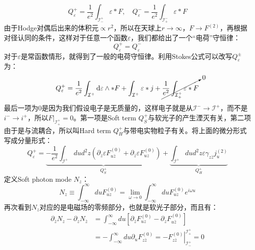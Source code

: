 \begin{equation}
	\boxed{
		Q_{\varepsilon}^{+}=\frac{1}{e^{2}}\int_{\mathcal I_{-}^{+}}\varepsilon*F,\quad Q_{\varepsilon}^{-}=\frac{1}{e^{2}}\int_{\mathcal I_{+}^{-}}\varepsilon*F
	}
\end{equation}
由于Hodge对偶后出来的体积元$\propto r^2$，所以在天球上$r\to\infty$，$F\to F^{(2)}$，再根据对径认同的条件，这样对于任意一个函数$\varepsilon$，我们都给出了一个“电荷”守恒律：
\begin{equation}
	\boxed{
	Q_\varepsilon^+=Q_\varepsilon^-
	}
\end{equation}
对于$\varepsilon$是常函数情形，就得到了一般的电荷守恒律。利用Stokes公式可以改写$Q_\varepsilon^{\pm}$为：
\begin{equation}
	Q_\varepsilon^+=\frac{1}{e^2}\int_{\mathcal{I}^+}\mathrm{d}\varepsilon\wedge*F+\int_{\mathcal{I}^+}\varepsilon*j+\cancelto{0}{\frac{1}{e^2}\int_{\mathcal{I}_+^+}\varepsilon*F}
\end{equation}
最后一项为0是因为我们假设电子是无质量的，这样电子就是从$\mathcal{I}^-\to\mathcal{I}^+$，而不是$i^{-}\to i^+$，所以$F|_{\mathcal{I}_+^{+}}=0$。第一项是Soft term $Q_S^+$与软光子的产生湮灭有关，第二项由于是与流耦合，所以叫Hard term $Q_H^+$与带电实物粒子有关。将上面的微分形式写成分量形式：
\begin{equation}
	Q_{\varepsilon}^{+}=\underbrace{-\frac{1}{e^{2}}\int_{\mathcal{I}^{+}}dud^{2}z\left(\partial_{z}\varepsilon F_{u\bar{z}}^{(0)}+\partial_{\bar{z}}\varepsilon F_{uz}^{(0)}\right)}_{Q_{S}^{+}}+\underbrace{\int_{\mathcal{I}^{+}}dud^{2}z\varepsilon\gamma_{z\bar{z}}j_{u}^{(2)}}_{Q_{H}^{+}}
\end{equation}
定义Soft photon mode $N_z$：
\begin{equation}\label{eq:23.18}
	N_{z}\equiv \int_{-\infty}^{\infty}duF_{uz}^{(0)}=\lim_{\omega\to0}\int_{-\infty}^{\infty}duF_{uz}^{(0)}e^{i\omega u}
\end{equation}
再次看到$N_z$对应的是电磁场的零频部分，也就是软光子部分，而且有：
\begin{equation}
	\begin{aligned}
		\partial_{\bar{z}}N_{z}-\partial_{z}N_{\bar{z}}& =\int_{-\infty}^{\infty}du\left[\partial_{\bar{z}}F_{uz}^{(0)}-\partial_{z}F_{u\bar{z}}^{(0)}\right]  \\
		&=-\int_{-\infty}^{\infty}du\left.\partial_{u}F_{z\bar{z}}^{(0)}=-F_{z\bar{z}}^{(0)}\right|_{\mathcal{I}_{-}^{+}}^{\mathcal{I}_{+}^{+}}=0
	\end{aligned}
\end{equation}
